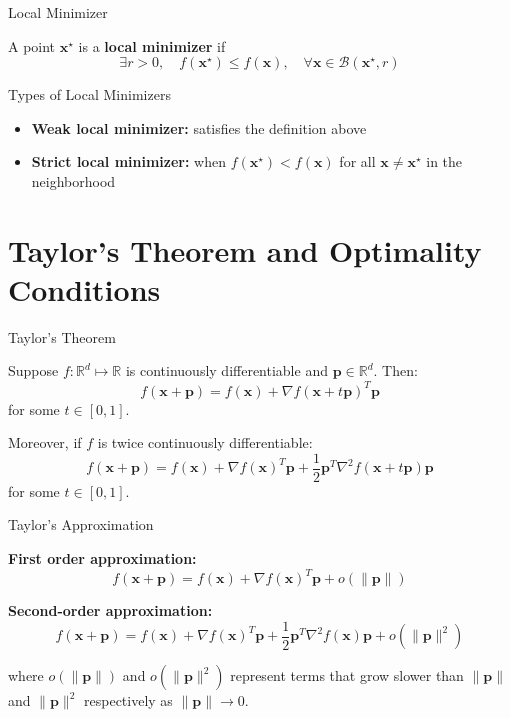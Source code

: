 \documentclass[aspectratio=1610]{beamer}
\begin{document}
\begin{frame}{Local Minimizer}
  \begin{definition}
    A point $\mathbf{x}^\star$ is a \textbf{local minimizer} if 
    $$\exists r > 0, \quad f(\mathbf{x}^\star) \leq f(\mathbf{x}), \quad \forall \mathbf{x} \in \mathcal{B}(\mathbf{x}^\star, r)$$
  \end{definition}
  
  \vspace{0.5cm}
  \begin{block}{Types of Local Minimizers}
    \begin{itemize}
      \item \textbf{Weak local minimizer:} satisfies the definition above
      \item \textbf{Strict local minimizer:} when $f(\mathbf{x}^\star) < f(\mathbf{x})$ for all $\mathbf{x} \neq \mathbf{x}^\star$ in the neighborhood
    \end{itemize}
  \end{block}
\end{frame}

\section{Taylor's Theorem and Optimality Conditions}

\begin{frame}{Taylor's Theorem}
  \begin{theorem}
    Suppose $f:\mathbb{R}^d \mapsto \mathbb{R}$ is continuously differentiable and $\mathbf{p} \in \mathbb{R}^d$. Then:
    $$f(\mathbf{x}+\mathbf{p}) = f(\mathbf{x}) + \nabla f(\mathbf{x}+t\mathbf{p})^T\mathbf{p}$$
    for some $t \in [0,1]$.
    
    \vspace{0.3cm}
    Moreover, if $f$ is twice continuously differentiable:
    $$f(\mathbf{x}+\mathbf{p}) = f(\mathbf{x}) + \nabla f(\mathbf{x})^T\mathbf{p} + \frac{1}{2}\mathbf{p}^T\nabla^2 f(\mathbf{x}+t\mathbf{p})\mathbf{p}$$
    for some $t \in [0,1]$.
  \end{theorem}
\end{frame}

\begin{frame}{Taylor's Approximation}
  \begin{theorem}
    \textbf{First order approximation:}
    $$f(\mathbf{x}+\mathbf{p}) = f(\mathbf{x}) + \nabla f(\mathbf{x})^T\mathbf{p} + o(\|\mathbf{p}\|)$$
    
    \vspace{0.3cm}
    \textbf{Second-order approximation:}
    $$f(\mathbf{x}+\mathbf{p}) = f(\mathbf{x}) + \nabla f(\mathbf{x})^T\mathbf{p} + \frac{1}{2}\mathbf{p}^T\nabla^2 f(\mathbf{x})\mathbf{p} + o(\|\mathbf{p}\|^2)$$
    
    where $o(\|\mathbf{p}\|)$ and $o(\|\mathbf{p}\|^2)$ represent terms that grow slower than $\|\mathbf{p}\|$ and $\|\mathbf{p}\|^2$ respectively as $\|\mathbf{p}\| \to 0$.
  \end{theorem}
\end{frame}
\end{document}
